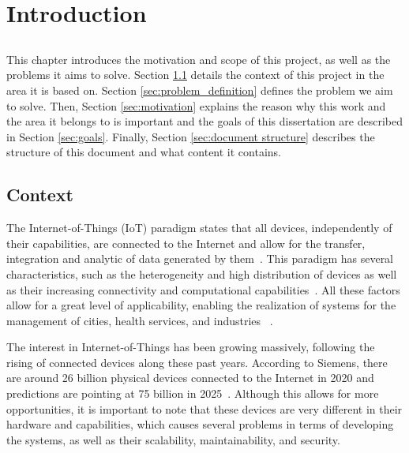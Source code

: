 \chapter{Introduction} \label{chap:intro}

\section*{}

\minitoc \mtcskip \noindent
This chapter introduces the motivation and scope of this project, as well as the problems it aims to solve. Section \ref{sec:context} details the context of this project in the area it is based on. Section \ref{sec:problem_definition} defines the problem we aim to solve. Then, Section \ref{sec:motivation} explains the reason why this work and the area it belongs to is important and the goals of this dissertation are described in Section \ref{sec:goals}. Finally, Section \ref{sec:document structure} describes the structure of this document and what content it contains.

\section{Context} \label{sec:context}

The Internet-of-Things (IoT) paradigm states that all devices, independently of their capabilities, are connected to the Internet and allow for the transfer, integration and analytic of data generated by them~\cite{IoT_principles_and_paradigms}. This paradigm has several characteristics, such as the heterogeneity and high distribution of devices as well as their increasing connectivity and computational capabilities~\cite{SoS}. All these factors allow for a great level of applicability, enabling the realization of systems for the management of cities, health services, and industries ~\cite{6851114}.

The interest in Internet-of-Things has been growing massively, following the rising of connected devices along these past years. According to Siemens, there are around 26 billion physical devices connected to the Internet in 2020 and predictions are pointing at 75 billion in 2025~\cite{tanweer}. Although this allows for more opportunities, it is important to note that these devices are very different in their hardware and capabilities, which causes several problems in terms of developing the systems, as well as their scalability, maintainability, and security. 

